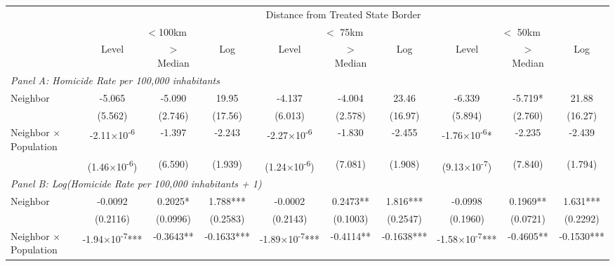 \documentclass[12pt]{article}
\begin{document}
\begin{landscape}
\begin{table}[htbp]
\begin{adjustbox}{max width=\textwidth, max height=\textheight}
\begin{tabular}{l@{\hspace{.5cm}}ccccccccc}
\toprule
& \multicolumn{9}{c}{Distance from Treated State Border} \\
\cmidrule(lr){2-10}
& \multicolumn{3}{c}{$<$100km} & \multicolumn{3}{c}{ $<$ 75km} & \multicolumn{3}{c}{$<$ 50km} \\
\cmidrule(lr){2-4} \cmidrule(lr){5-7} \cmidrule(lr){8-10}
& Level & $>$ Median & Log & Level & $>$ Median & Log & Level & $>$ Median & Log \\
\midrule
\multicolumn{10}{l}{\textit{Panel A: Homicide Rate per 100,000 inhabitants}} \\[.25cm]
Neighbor                     & -5.065          & -5.090          & 19.95          & -4.137          & -4.004          & 23.46          & -6.339          & -5.719*         & 21.88          \\
                            & (5.562)         & (2.746)         & (17.56)        & (6.013)         & (2.578)         & (16.97)        & (5.894)         & (2.760)         & (16.27)        \\[.25cm]
Neighbor × Population       & -2.11×10\textsuperscript{-6} & -1.397          & -2.243         & -2.27×10\textsuperscript{-6} & -1.830          & -2.455         & -1.76×10\textsuperscript{-6}* & -2.235          & -2.439         \\
                            & (1.46×10\textsuperscript{-6}) & (6.590)         & (1.939)        & (1.24×10\textsuperscript{-6}) & (7.081)         & (1.908)        & (9.13×10\textsuperscript{-7}) & (7.840)         & (1.794)        \\[.25cm]
\multicolumn{10}{l}{\textit{Panel B: Log(Homicide Rate per 100,000 inhabitants + 1)}} \\[.25cm]
Neighbor                     & -0.0092         & 0.2025*         & 1.788***       & -0.0002         & 0.2473**        & 1.816***       & -0.0998         & 0.1969**        & 1.631***       \\
                            & (0.2116)        & (0.0996)        & (0.2583)       & (0.2143)        & (0.1003)        & (0.2547)       & (0.1960)        & (0.0721)        & (0.2292)       \\[.25cm]
Neighbor × Population       & -1.94×10\textsuperscript{-7}*** & -0.3643**       & -0.1633***     & -1.89×10\textsuperscript{-7}*** & -0.4114**       & -0.1638***     & -1.58×10\textsuperscript{-7}*** & -0.4605**       & -0.1530***     \\

\end{tabular}
\end{adjustbox}
\end{table}
\end{landscape}
\end{document}
